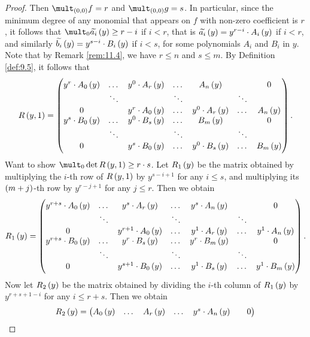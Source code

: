 \begin{proof}
Then $ \mult_{\br{0, 0}} f = r $ and $ \mult_{\br{0, 0}} g = s $. In particular, since the minimum degree of any monomial that appears on $ f $ with non-zero coefficient is $ r $, it follows that $ \mult_0 \widetilde{a_i}\br{y} \ge r - i $ if $ i < r $, that is $ \widetilde{a_i}\br{y} = y^{r - i} \cdot A_i\br{y} $ if $ i < r $, and similarly $ \widetilde{b_i}\br{y} = y^{s - i} \cdot B_i\br{y} $ if $ i < s $, for some polynomials $ A_i $ and $ B_i $ in $ y $. Note that by Remark \ref{rem:11.4}, we have $ r \le n $ and $ s \le m $. By Definition \ref{def:9.5}, it follows that
$$ R\br{y, 1} =
\begin{pmatrix}
y^r \cdot A_0\br{y} & \dots & y^0 \cdot A_r\br{y} & \dots & A_n\br{y} & & 0 \\
& \ddots & & \ddots & & \ddots & \\
0 & & y^r \cdot A_0\br{y} & \dots & y^0 \cdot A_r\br{y} & \dots & A_n\br{y} \\
y^s \cdot B_0\br{y} & \dots & y^0 \cdot B_s\br{y} & \dots & B_m\br{y} & & 0 \\
& \ddots & & \ddots & & \ddots & \\
0 & & y^s \cdot B_0\br{y} & \dots & y^0 \cdot B_s\br{y} & \dots & B_m\br{y}
\end{pmatrix}.
$$
Want to show $ \mult_0 \det R\br{y, 1} \ge r \cdot s $. Let $ R_1\br{y} $ be the matrix obtained by multiplying the $ i $-th row of $ R\br{y, 1} $ by $ y^{s - i + 1} $ for any $ i \le s $, and multiplying its $ \br{m + j} $-th row by $ y^{r - j + 1} $ for any $ j \le r $. Then we obtain
$$ R_1\br{y} =
\begin{pmatrix}
y^{r + s} \cdot A_0\br{y} & \dots & y^s \cdot A_r\br{y} & \dots & y^s \cdot A_n\br{y} & & 0 \\
& \ddots & & \ddots & & \ddots & \\
0 & & y^{r + 1} \cdot A_0\br{y} & \dots & y^1 \cdot A_r\br{y} & \dots & y^1 \cdot A_n\br{y} \\
y^{r + s} \cdot B_0\br{y} & \dots & y^r \cdot B_s\br{y} & \dots & y^r \cdot B_m\br{y} & & 0 \\
& \ddots & & \ddots & & \ddots & \\
0 & & y^{s + 1} \cdot B_0\br{y} & \dots & y^1 \cdot B_s\br{y} & \dots & y^1 \cdot B_m\br{y}
\end{pmatrix}.
$$
Now let $ R_2\br{y} $ be the matrix obtained by dividing the $ i $-th column of $ R_1\br{y} $ by $ y^{r + s + 1 - i} $ for any $ i \le r + s $. Then we obtain
$$ R_2\br{y} =
\begin{pmatrix}
A_0\br{y} & \dots & A_r\br{y} & \dots & y^s \cdot A_n\br{y} & & 0 \\

\end{pmatrix}$$
\end{proof}
